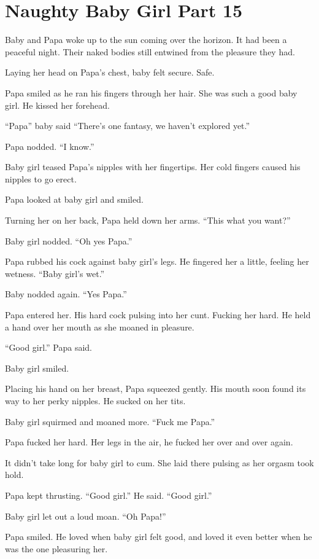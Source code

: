 \section{Naughty Baby Girl Part 15}

     Baby and Papa woke up to the sun coming over the horizon. It had been a peaceful night. Their naked bodies still entwined from the pleasure they had.

     Laying her head on Papa’s chest, baby felt secure. Safe.

     Papa smiled as he ran his fingers through her hair. She was such a good baby girl. He kissed her forehead.

     “Papa” baby said “There’s one fantasy, we haven’t explored yet.”

     Papa nodded. “I know.”

     Baby girl teased Papa’s nipples with her fingertips. Her cold fingers caused his nipples to go erect.

     Papa looked at baby girl and smiled.

     Turning her on her back, Papa held down her arms. “This what you want?”

     Baby girl nodded. “Oh yes Papa.”

     Papa rubbed his cock against baby girl’s legs. He fingered her a little, feeling her wetness. “Baby girl’s wet.”

     Baby nodded again. “Yes Papa.”

     Papa entered her. His hard cock pulsing into her cunt. Fucking her hard. He held a hand over her mouth as she moaned in pleasure.

     “Good girl.” Papa said.

     Baby girl smiled.

     Placing his hand on her breast, Papa squeezed gently. His mouth soon found its way to her perky nipples. He sucked on her tits.

     Baby girl squirmed and moaned more. “Fuck me Papa.”

     Papa fucked her hard. Her legs in the air, he fucked her over and over again.

     It didn’t take long for baby girl to cum. She laid there pulsing as her orgasm took hold.

     Papa kept thrusting. “Good girl.” He said. “Good girl.”

     Baby girl let out a loud moan. “Oh Papa!”

     Papa smiled. He loved when baby girl felt good, and loved it even better when he was the one pleasuring her.


